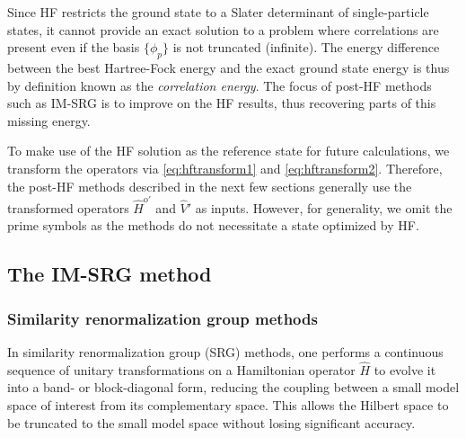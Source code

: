 \documentclass[amsmath, amssymb, aps, floatfix, nofootinbib, preprintnumbers,showpacs, superscriptaddress, twocolumn]{revtex4-1}
\begin{document}
Since HF restricts the ground state to a Slater determinant of single-particle
states, it cannot provide an exact solution to a problem where correlations
are present even if the basis $\{\phi_p\}$ is not truncated (infinite).  The
energy difference between the best Hartree-Fock energy and the exact ground
state energy is thus by definition known as the \textit{correlation energy}.
The focus of post-HF methods such as IM-SRG is to improve on the HF results,
thus recovering parts of this missing energy.

To make use of the HF solution as the reference state for future calculations, we transform the operators via \eqref{eq:hftransform1} and \eqref{eq:hftransform2}.  Therefore, the post-HF methods described in the next few sections generally use the transformed operators $\hat H^{\text{o} \prime}$ and $\hat V'$ as inputs.  However, for generality, we omit the prime symbols as the methods do not necessitate a state optimized by HF.

\subsection{The IM-SRG method}
\label{subsec:imsrgmethod}

\subsubsection{Similarity renormalization group methods}
\label{subsubsec:srgmethods}

In similarity renormalization group (SRG) methods, one performs a continuous
sequence of unitary transformations on a Hamiltonian operator $\hat H$ to
evolve it into a band- or block-diagonal form, reducing the coupling between a
small model space of interest from its complementary space.  This allows the
Hilbert space to be truncated to the small model space without losing
significant accuracy.
\end{document}
